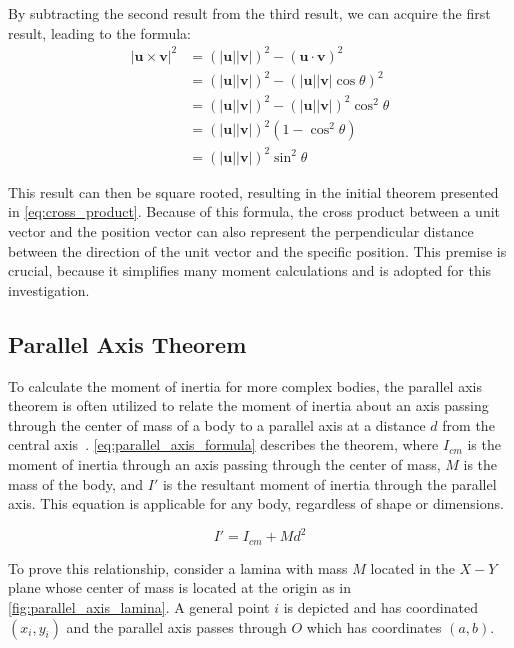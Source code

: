By subtracting the second result from the third result, we can acquire the first result, leading to the formula:
\begin{align*}
|\bm{u} \times \bm{v}|^2 &= (|\bm{u}||\bm{v}|)^2 - (\bm{u} \cdot \bm{v})^2 \\
&= (|\bm{u}||\bm{v}|)^2 - (|\bm{u}||\bm{v}|\cos{\theta})^2 \\
&= (|\bm{u}||\bm{v}|)^2 - (|\bm{u}||\bm{v}|)^2\cos^2{\theta} \\
&= (|\bm{u}||\bm{v}|)^2(1 - \cos^2{\theta}) \\
&= (|\bm{u}||\bm{v}|)^2\sin^2{\theta}
\end{align*}

This result can then be square rooted, resulting in the initial theorem presented in \cref{eq:cross_product}. Because of this formula, the cross product between a unit vector and the position vector can also represent the perpendicular distance between the direction of the unit vector and the specific position. This premise is crucial, because it simplifies many moment calculations and is adopted for this investigation.

\subsection{Parallel Axis Theorem}

To calculate the moment of inertia for more complex bodies, the parallel axis theorem is often utilized to relate the moment of inertia about an axis passing through the center of mass of a body to a parallel axis at a distance $d$ from the central axis~\parencite{Abdulghany_2017}. \cref{eq:parallel_axis_formula} describes the theorem, where $I_{cm}$ is the moment of inertia through an axis passing through the center of mass, $M$ is the mass of the body, and $I'$ is the resultant moment of inertia through the parallel axis. This equation is applicable for any body, regardless of shape or dimensions.

\begin{equation}
I' = I_{cm} + Md^2
\label{eq:parallel_axis_formula}
\end{equation}

To prove this relationship, consider a lamina with mass $M$ located in the $X-Y$ plane whose center of mass is located at the origin as in \cref{fig:parallel_axis_lamina}. A general point $i$ is depicted and has coordinated $(x_i, y_i)$ and the parallel axis passes through $O$ which has coordinates $(a, b)$.

